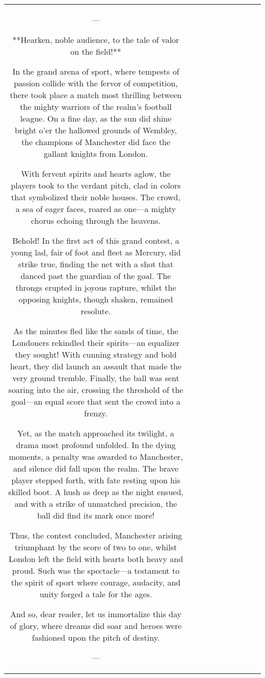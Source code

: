 \begin{table}[h!]
\begin{tabular}{|c|c|c|c|c|c|c|c|c|c|}
---

**Hearken, noble audience, to the tale of valor on the field!**

In the grand arena of sport, where tempests of passion collide with the fervor of competition, there took place a match most thrilling between the mighty warriors of the realm’s football league. On a fine day, as the sun did shine bright o'er the hallowed grounds of Wembley, the champions of Manchester did face the gallant knights from London.

With fervent spirits and hearts aglow, the players took to the verdant pitch, clad in colors that symbolized their noble houses. The crowd, a sea of eager faces, roared as one—a mighty chorus echoing through the heavens.

Behold! In the first act of this grand contest, a young lad, fair of foot and fleet as Mercury, did strike true, finding the net with a shot that danced past the guardian of the goal. The throngs erupted in joyous rapture, whilst the opposing knights, though shaken, remained resolute.

As the minutes fled like the sands of time, the Londoners rekindled their spirits—an equalizer they sought! With cunning strategy and bold heart, they did launch an assault that made the very ground tremble. Finally, the ball was sent soaring into the air, crossing the threshold of the goal—an equal score that sent the crowd into a frenzy.

Yet, as the match approached its twilight, a drama most profound unfolded. In the dying moments, a penalty was awarded to Manchester, and silence did fall upon the realm. The brave player stepped forth, with fate resting upon his skilled boot. A hush as deep as the night ensued, and with a strike of unmatched precision, the ball did find its mark once more!

Thus, the contest concluded, Manchester arising triumphant by the score of two to one, whilst London left the field with hearts both heavy and proud. Such was the spectacle—a testament to the spirit of sport where courage, audacity, and unity forged a tale for the ages.

And so, dear reader, let us immortalize this day of glory, where dreams did soar and heroes were fashioned upon the pitch of destiny.

--- 


\end{tabular}
\end{table}
